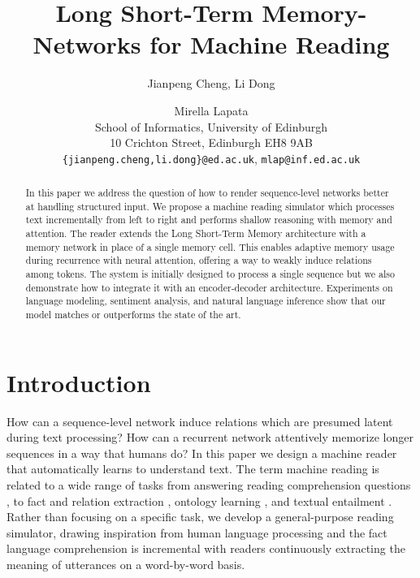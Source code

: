 \documentclass[11pt,letterpaper]{article}
\title{Long Short-Term Memory-Networks for Machine Reading}
\author{Jianpeng Cheng, Li Dong \and Mirella Lapata\\
School of Informatics, University of Edinburgh\\
10 Crichton Street, Edinburgh EH8 9AB\\
\texttt{\{jianpeng.cheng,li.dong\}@ed.ac.uk}, \texttt{mlap@inf.ed.ac.uk}
}
\begin{document}
	\maketitle
	\begin{abstract}

          In this paper we address the question of how to render
          sequence-level networks better at handling structured input.
          We propose a machine reading simulator which processes text
          incrementally from left to right and performs shallow
          reasoning with memory and attention. The reader extends the
          Long Short-Term Memory architecture with a memory network in
          place of a single memory cell. This enables adaptive memory
          usage during recurrence with neural attention, offering a
          way to weakly induce relations among tokens.  The system is
          initially designed to process a single sequence but we also
          demonstrate how to integrate it with an encoder-decoder
          architecture.  Experiments on language modeling, sentiment
          analysis, and natural language inference show that our model
          matches or outperforms the state of the art.
		
	\end{abstract}
	


\section{Introduction}


        How can a sequence-level network induce relations which are
        presumed latent during text processing? How can a recurrent
        network attentively memorize longer sequences in a way that
        humans do?  In this paper we design a machine reader that
        automatically learns to understand text.  The term machine
        reading is related to a wide range of tasks from answering
        reading comprehension questions \cite{Clark:ea:2013}, to fact
        and relation extraction
        \cite{Etzioni:etal:2011,fader-soderland-etzioni:2011:EMNLP},
        ontology learning \cite{poon-domingos:2010:ACL}, and textual
        entailment \cite{Dagan:ea:2005}. Rather than focusing on a
        specific task, we develop a general-purpose reading simulator,
        drawing inspiration from human language processing and the
        fact language comprehension is incremental with readers
        continuously extracting the meaning of utterances on a
        word-by-word basis.
\end{document}
